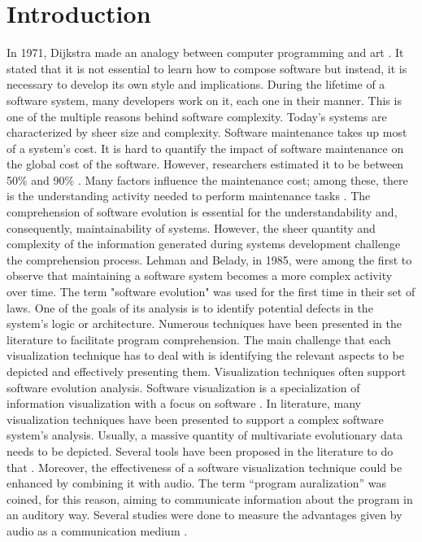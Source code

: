 \chapter{Introduction}

In 1971, Dijkstra made an analogy between computer programming and art \cite{Dijkstra1971a}.
It stated that it is not essential to learn how to compose software but instead, it is necessary to develop its own style and implications. 
During the lifetime of a software system, many developers work on it, each one in their manner. This is one of the multiple reasons behind software complexity. 
Today's systems are characterized by sheer size and complexity. Software maintenance takes up most of a system's cost. It is hard to quantify the impact of software maintenance on the global cost of the software. 
However, researchers estimated it to be between 50\% and 90\% \cite{Davis1995} \cite{Sommerville1995}\cite{Erlikh2000} \cite{seacord2003}. Many factors influence the maintenance cost; among these, there is the understanding activity needed to perform maintenance tasks \cite{Corbi1989}. The comprehension of software evolution is essential for the understandability and, consequently, maintainability of systems. However, the sheer quantity and complexity of the information generated during systems development challenge the comprehension process. Lehman and Belady, in 1985, were among the first to observe that maintaining a software system becomes a more complex activity over time. \cite{Lehman1985} The term "software evolution" was used for the first time in their set of laws.  One of the goals of its analysis is to identify potential defects in the system's logic or architecture. Numerous techniques have been presented in the literature to facilitate program comprehension. The main challenge that each visualization technique has to deal with is identifying the relevant aspects to be depicted and effectively presenting them. Visualization techniques often support software evolution analysis. Software visualization is a specialization of information visualization with a focus on software \cite{Lanza2003}. In literature, many visualization techniques have been presented to support a complex software system's analysis. Usually, a massive quantity of multivariate evolutionary data needs to be depicted. Several tools have been proposed in the literature to do that \cite{Merino2018a}. Moreover, the effectiveness of a software visualization technique could be enhanced by combining it with audio. The term ``program auralization'' was coined, for this reason, aiming to communicate information about the program in an auditory way.
Several studies were done to measure the advantages given by audio as a communication medium \cite{Alty1995}.

